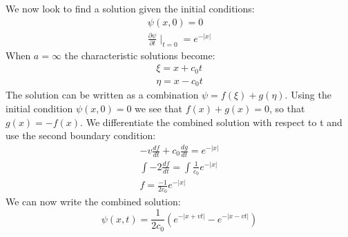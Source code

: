 \documentclass[a4paper,10pt]{article}
\numberwithin{equation}{section}
\begin{document}
We now look to find a solution given the initial conditions:
\begin{gather}
\psi(x,0)=0\\
\frac{\partial \psi}{\partial t}\mid_{t=0}=e^{-|x|}
\end{gather}
When $a=\infty$ the characteristic solutions become:
\begin{gather}
\xi=x+c_0t\\
\eta=x-c_0t
\end{gather}
The solution can be written as a combination $\psi=f(\xi)+g(\eta)$. 
Using the initial condition $\psi(x,0)=0$ we see that $f(x)+g(x)=0$, so that $g(x)=-f(x)$.
We differentiate the combined solution with respect to t and use the second boundary condition:
\begin{gather}
-v\frac{df}{dt}+c_0\frac{dg}{dt}=e^{-|x|}\\
\int-2\frac{df}{dt}=\int\frac{1}{c_0}e^{-|x|}\\
f=\frac{-1}{2c_0}e^{-|x|}
\end{gather}
We can now write the combined solution:
\begin{equation}
\psi(x,t)=\frac{1}{2c_0}(e^{-|x+vt|}-e^{-|x-vt|}) 
\end{equation}
\end{document}
